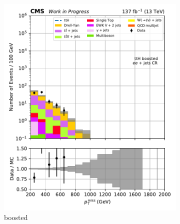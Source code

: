 \begin{figure}[htbp]
    \centering
    \begin{subfigure}[b]{0.24\textwidth}
        \includegraphics[width=\textwidth]{figures/region_plots/full_Run2/region_4/ttH_boosted.pdf}
        \caption{\ttH boosted}
    \end{subfigure}
    \hfill
    \begin{subfigure}[b]{0.24\textwidth}

\end{subfigure}
\end{figure}
